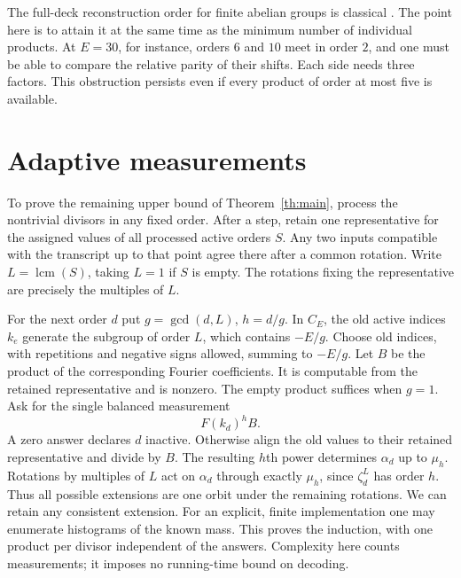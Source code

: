 \documentclass[11pt,letterpaper]{article}
\DeclareMathOperator{\lcm}{lcm}
\begin{document}
The full-deck reconstruction order for finite abelian groups is classical \cite{Pebody,CO}. The point here is to attain it at the same time as the minimum number of individual products. At $E=30$, for instance, orders $6$ and $10$ meet in order $2$, and one must be able to compare the relative parity of their shifts. Each side needs three factors. This obstruction persists even if every product of order at most five is available.

\newpage
\section{Adaptive measurements}
To prove the remaining upper bound of Theorem~\ref{th:main}, process the nontrivial divisors in any fixed order. After a step, retain one representative for the assigned values of all processed active orders $S$. Any two inputs compatible with the transcript up to that point agree there after a common rotation. Write $L=\lcm(S)$, taking $L=1$ if $S$ is empty. The rotations fixing the representative are precisely the multiples of $L$.

For the next order $d$ put $g=\gcd(d,L)$, $h=d/g$. In $C_E$, the old active indices $k_e$ generate the subgroup of order $L$, which contains $-E/g$. Choose old indices, with repetitions and negative signs allowed, summing to $-E/g$. Let $B$ be the product of the corresponding Fourier coefficients. It is computable from the retained representative and is nonzero. The empty product suffices when $g=1$. Ask for the single balanced measurement
\[
                      F(k_d)^h B .
\]
A zero answer declares $d$ inactive. Otherwise align the old values to their retained representative and divide by $B$. The resulting $h$th power determines $\alpha_d$ up to $\mu_h$. Rotations by multiples of $L$ act on $\alpha_d$ through exactly $\mu_h$, since $\zeta_d^L$ has order $h$. Thus all possible extensions are one orbit under the remaining rotations. We can retain any consistent extension. For an explicit, finite implementation one may enumerate histograms of the known mass. This proves the induction, with one product per divisor independent of the answers. Complexity here counts measurements; it imposes no running-time bound on decoding.
\end{document}
